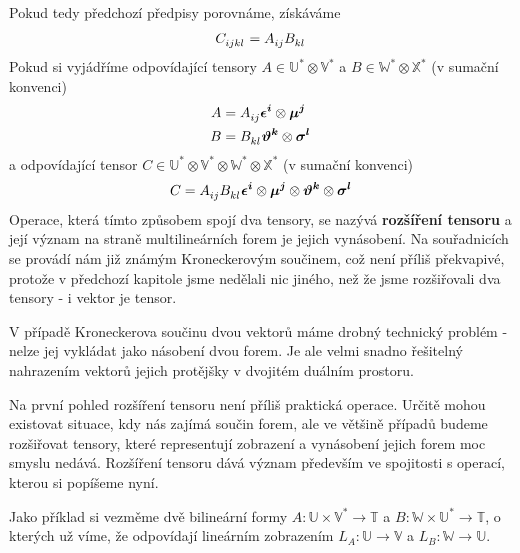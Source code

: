 \documentclass[a5paper,12pt]{amsbook}
\theoremstyle{definition}
\newcommand{\myvec}[1]{\bm{#1}}
\newcommand{\myspace}[1]{\mathbb{#1}}
\begin{document}
Pokud tedy předchozí předpisy porovnáme, získáváme
\begin{equation*}
\begin{split}
C\indices{_i_j_k_l} = A\indices{_i_j} B\indices{_k_l}
\end{split}
\end{equation*}
Pokud si vyjádříme odpovídající tensory $A\in\myspace{U^*}\otimes\myspace{V^*}$
a $B\in\myspace{W^*}\otimes\myspace{X^*}$ (v sumační konvenci)
\begin{equation*}
\begin{split}
A &= A\indices{_i_j} \myvec{\epsilon^i}\otimes\myvec{\mu^j} \\
B &= B\indices{_k_l} \myvec{\vartheta^k}\otimes\myvec{\sigma^l}
\end{split}
\end{equation*}
a odpovídající tensor $C\in\myspace{U^*}\otimes\myspace{V^*}\otimes\myspace{W^*}\otimes\myspace{X^*}$
(v sumační konvenci)
\begin{equation*}
\begin{split}
C = A\indices{_i_j} B\indices{_k_l}
\myvec{\epsilon^i}\otimes\myvec{\mu^j}\otimes\myvec{\vartheta^k}\otimes\myvec{\sigma^l}
\end{split}
\end{equation*}
Operace, která tímto způsobem spojí dva tensory, se nazývá \textbf{rozšíření tensoru}
a její význam na straně multilineárních forem je jejich vynásobení. Na souřadnicích
se provádí nám již známým Kroneckerovým součinem, což není příliš překvapivé, protože
v předchozí kapitole jsme nedělali nic jiného, než že jsme rozšiřovali dva tensory -
i vektor je tensor.

V případě Kroneckerova součinu dvou vektorů máme drobný technický problém - nelze
jej vykládat jako násobení dvou forem. Je ale velmi snadno řešitelný nahrazením
vektorů jejich protějšky v dvojitém duálním prostoru.

Na první pohled rozšíření tensoru není příliš praktická operace. Určitě mohou existovat
situace, kdy nás zajímá součin forem, ale ve většině případů budeme rozšiřovat tensory,
které representují zobrazení a vynásobení jejich forem moc smyslu nedává. Rozšíření
tensoru dává význam především ve spojitosti s operací, kterou si popíšeme nyní.

Jako příklad si vezměme dvě bilineární formy $A: \myspace{U}\times\myspace{V^*}\rightarrow\myspace{T}$
a $B: \myspace{W}\times\myspace{U^*}\rightarrow\myspace{T}$, o kterých už víme, že
odpovídají lineárním zobrazením $L_A: \myspace{U}\rightarrow\myspace{V}$
a $L_B: \myspace{W}\rightarrow\myspace{U}$.
\end{document}
